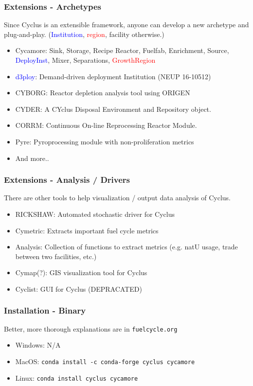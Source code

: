 \begin{frame}
	\frametitle{Extensions - Archetypes}
	Since Cyclus is an extensible framework, anyone can develop a new archetype and plug-and-play. (\textcolor{blue}{Institution}, \textcolor{red}{region}, facility otherwise.)
	\begin{itemize}
		\item Cycamore: Sink, Storage, Recipe Reactor, Fuelfab, Enrichment, Source, \textcolor{blue}{DeployInst}, Mixer, Separations, \textcolor{red}{GrowthRegion}
		\item \textcolor{blue}{d3ploy}: Demand-driven deployment Institution (NEUP 16-10512)
		\item CYBORG: Reactor depletion analysis tool using ORIGEN
		\item CYDER: A CYclus Disposal Environment and Repository object.
		\item CORRM: Continuous On-line Reprocessing Reactor Module.
		\item Pyre: Pyroprocessing module with non-proliferation metrics
		\item And more..
	\end{itemize}
\end{frame}

\begin{frame}
	\frametitle{Extensions - Analysis / Drivers}
	There are other tools to help visualization / output data analysis of Cyclus.
	\begin{itemize}
		\item RICKSHAW: Automated stochastic driver for Cyclus
		\item Cymetric: Extracts important fuel cycle metrics
		\item Analysis: Collection of functions to extract metrics (e.g. natU usage, trade between two facilities, etc.)
		\item Cymap(?): GIS visualization tool for Cyclus
		\item Cyclist: GUI for Cyclus (DEPRACATED)
	\end{itemize}
\end{frame}


\begin{frame}
	\frametitle{Installation - Binary}
	Better, more thorough explanations are in \texttt{fuelcycle.org}
	\begin{itemize}
		\item Windows: N/A
		\item MacOS: \texttt{conda install -c conda-forge cyclus cycamore}
		\item Linux: \texttt{conda install cyclus cycamore}
	\end{itemize}
\end{frame}


